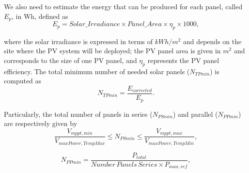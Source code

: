 \documentclass[10pt,conference]{IEEEtran}
\begin{document}
We also need to estimate the energy that can be produced for each panel, called $E_{p}$, in Wh, defined as
%
\begin{equation}
\label{eq:Ep}
\scriptstyle E_{p} = \scriptstyle Solar\_Irradiance \times Panel\_Area \times \eta_{p} \times 1000,
\end{equation}

\noindent where the solar irradiance is expressed in terms of $kWh/m^{2}$ and depends on the site where the PV system will be deployed; 
the PV panel area is given in $m^{2}$ and corresponds to the size of one PV panel, and $\eta_{p}$ represents the PV panel efficiency.
%
The total minimum number of needed solar panels ($N_{TPmin}$) is computed as
%
\begin{equation}
\label{eq:NTPmin}
\scriptstyle N_{TPmin} = \dfrac{\scriptstyle E_{corrected}}{\scriptstyle E_{p}}.
\end{equation}

Particularly, the total number of panels in series ($N_{PSmin}$) and parallel ($N_{PPmin}$) are respectively given by
%
\begin{equation}
\label{eq:NPSmin}
\dfrac{\scriptstyle V_{mppt,min}}{\scriptstyle V_{maxPower,TempMax}} \scriptstyle \leq \scriptstyle N_{PSmin} \leq \dfrac{\scriptstyle V_{mppt,max}}{\scriptstyle V_{maxPower,TempMin}},
\end{equation}

\begin{equation}
\label{eq:NPPmin}
\scriptstyle N_{PPmin} = \dfrac{\scriptstyle P_{total}}{\scriptstyle Number\,Panels\,Series \scriptstyle \times \scriptstyle P_{max,ref}},
\end{equation}
\end{document}
